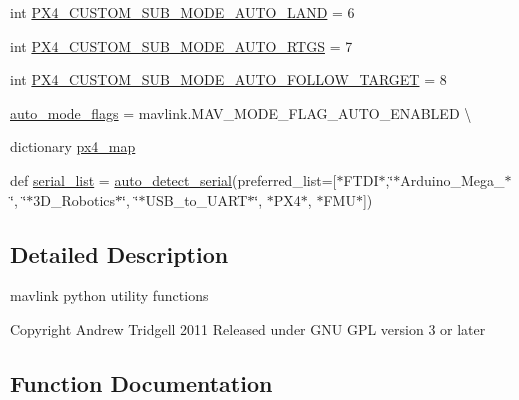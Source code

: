 \begin{DoxyCompactItemize}
\item 
int \mbox{\hyperlink{namespacepymavlink_1_1mavutil_a0e886e3a7e3282bf94852836ee47ada0}{P\+X4\+\_\+\+C\+U\+S\+T\+O\+M\+\_\+\+S\+U\+B\+\_\+\+M\+O\+D\+E\+\_\+\+A\+U\+T\+O\+\_\+\+L\+A\+ND}} = 6
\item 
int \mbox{\hyperlink{namespacepymavlink_1_1mavutil_afc5d33392a08ced60b37fcec5221ef1f}{P\+X4\+\_\+\+C\+U\+S\+T\+O\+M\+\_\+\+S\+U\+B\+\_\+\+M\+O\+D\+E\+\_\+\+A\+U\+T\+O\+\_\+\+R\+T\+GS}} = 7
\item 
int \mbox{\hyperlink{namespacepymavlink_1_1mavutil_a5c8613d55aee9bb1eb9b4e741818e612}{P\+X4\+\_\+\+C\+U\+S\+T\+O\+M\+\_\+\+S\+U\+B\+\_\+\+M\+O\+D\+E\+\_\+\+A\+U\+T\+O\+\_\+\+F\+O\+L\+L\+O\+W\+\_\+\+T\+A\+R\+G\+ET}} = 8
\item 
\mbox{\hyperlink{namespacepymavlink_1_1mavutil_abff145f84bef16fa8ccf3ec9c194e72f}{auto\+\_\+mode\+\_\+flags}} = mavlink.\+M\+A\+V\+\_\+\+M\+O\+D\+E\+\_\+\+F\+L\+A\+G\+\_\+\+A\+U\+T\+O\+\_\+\+E\+N\+A\+B\+L\+ED \textbackslash{}
\item 
dictionary \mbox{\hyperlink{namespacepymavlink_1_1mavutil_ab6d8931a7f4086e5bfbc12c07ea21a04}{px4\+\_\+map}}
\item 
def \mbox{\hyperlink{namespacepymavlink_1_1mavutil_ae279994be4b353d3acb4fd7a396e1164}{serial\+\_\+list}} = \mbox{\hyperlink{namespacepymavlink_1_1mavutil_a256e344d1870c0a938cac5b21d3003be}{auto\+\_\+detect\+\_\+serial}}(preferred\+\_\+list=\mbox{[}\textquotesingle{}$\ast$F\+T\+DI$\ast$\textquotesingle{},\char`\"{}$\ast$Arduino\+\_\+\+Mega\+\_$\ast$\char`\"{}, \char`\"{}$\ast$3\+D\+\_\+\+Robotics$\ast$\char`\"{}, \char`\"{}$\ast$\+U\+S\+B\+\_\+to\+\_\+\+U\+A\+R\+T$\ast$\char`\"{}, \textquotesingle{}$\ast$\+P\+X4$\ast$\textquotesingle{}, \textquotesingle{}$\ast$\+F\+M\+U$\ast$\textquotesingle{}\mbox{]})
\end{DoxyCompactItemize}


\subsection{Detailed Description}
\begin{DoxyVerb}mavlink python utility functions

Copyright Andrew Tridgell 2011
Released under GNU GPL version 3 or later
\end{DoxyVerb}
 

\subsection{Function Documentation}
\mbox{\label{namespacepymavlink_1_1mavutil_ad8151d7419cca7f25a52185b8844c09e}} 
